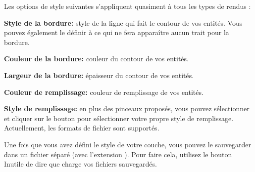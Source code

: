 Les options de style suivantes s'appliquent quasiment à tous les types de rendus :
\begin{description}
\item \textbf{Style de la bordure:} style de la ligne qui fait le contour de 
vos entités. Vous pouvez également le définir à  ce qui ne fera apparaître aucun trait pour la bordure.
\item \textbf{Couleur de la bordure:} couleur du contour de vos entités.
\item \textbf{Largeur de la bordure:} épaisseur du contour de vos entités.
\item \textbf{Couleur de remplissage:} couleur de remplissage de vos entités.
\item \textbf{Style de remplissage:} en plus des pinceaux proposés, vous pouvez 
sélectionner  et cliquer sur le 
bouton \browsebutton pour sélectionner votre propre style de remplissage. 
Actuellement, les formats de fichier  
sont supportés.
\end{description}

Une fois que vous avez défini le style de votre couche, vous pouvez le 
sauvegarder dans un fichier séparé (avec l'extension ). Pour 
faire cela, utilisez le bouton  Inutile de 
dire que  charge vos fichiers sauvegardés.

